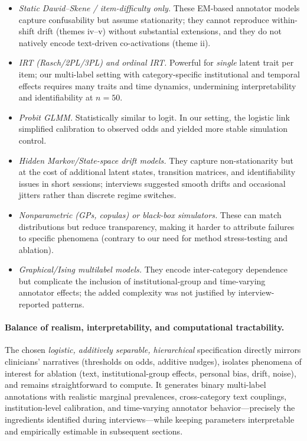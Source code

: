\documentclass[12pt]{article}
\begin{document}
\begin{itemize}
\item \emph{Static Dawid–Skene / item-difficulty only.} These EM-based annotator models capture confusability but assume stationarity; they cannot reproduce within-shift drift (themes iv–v) without substantial extensions, and they do not natively encode text-driven co-activations (theme ii).
\item \emph{IRT (Rasch/2PL/3PL) and ordinal IRT.} Powerful for \emph{single} latent trait per item; our multi-label setting with category-specific institutional and temporal effects requires many traits and time dynamics, undermining interpretability and identifiability at $n=50$.
\item \emph{Probit GLMM.} Statistically similar to logit. In our setting, the logistic link simplified calibration to observed odds and yielded more stable simulation control.
\item \emph{Hidden Markov/State-space drift models.} They capture non-stationarity but at the cost of additional latent states, transition matrices, and identifiability issues in short sessions; interviews suggested smooth drifts and occasional jitters rather than discrete regime switches.
\item \emph{Nonparametric (GPs, copulas) or black-box simulators.} These can match distributions but reduce transparency, making it harder to attribute failures to specific phenomena (contrary to our need for method stress-testing and ablation).
\item \emph{Graphical/Ising multilabel models.} They encode inter-category dependence but complicate the inclusion of institutional-group and time-varying annotator effects; the added complexity was not justified by interview-reported patterns.
\end{itemize}

\paragraph{Balance of realism, interpretability, and computational tractability.}
The chosen \emph{logistic, additively separable, hierarchical} specification directly mirrors clinicians’ narratives (thresholds on odds, additive nudges), isolates phenomena of interest for ablation (text, institutional-group effects, personal bias, drift, noise), and remains straightforward to compute. It generates binary multi-label annotations with realistic marginal prevalences, cross-category text couplings, institution-level calibration, and time-varying annotator behavior---precisely the ingredients identified during interviews---while keeping parameters interpretable and empirically estimable in subsequent sections.
\end{document}
